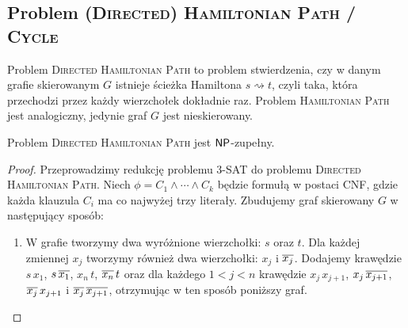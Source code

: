 \subsection{Problem \textsc{(Directed) Hamiltonian Path / Cycle}}

Problem \textsc{Directed Hamiltonian Path} to problem stwierdzenia, czy w danym grafie skierowanym $G$ istnieje ścieżka Hamiltona $s \rightsquigarrow t$, czyli taka, która przechodzi przez każdy wierzchołek dokładnie raz. Problem \textsc{Hamiltonian Path} jest analogiczny, jedynie graf $G$ jest nieskierowany.

\begin{theorem}
    Problem \textsc{Directed Hamiltonian Path} jest $\textsf{NP}$-zupełny.
\end{theorem}
\begin{proof}
    Przeprowadzimy redukcję problemu 3-SAT do problemu \textsc{Directed Hamiltonian Path}. Niech $\phi = C_1 \land \cdots \land C_k$ będzie formułą w postaci CNF, gdzie każda klauzula $C_i$ ma co najwyżej trzy literały. Zbudujemy graf skierowany $G$ w następujący sposób:
    \begin{enumerate}
        \item W grafie tworzymy dwa wyróżnione wierzchołki: $s$ oraz $t$. Dla każdej zmiennej $x_j$ tworzymy również dwa wierzchołki: $x_j$ i $\overline{x_j}$. Dodajemy krawędzie $s\,x_1$, $s\,\overline{x_1}$, $x_n\,t$, $\overline{x_n}\,t$ oraz dla każdego $1 < j < n$ krawędzie $x_j\,x_{j+1}$, $x_j\,\overline{x_{j+1}}$, $\overline{x_j}\,x_{j+1}$ i $\overline{x_j}\,\overline{x_{j+1}}$, otrzymując w ten sposób poniższy graf.
        \begin{figure}[H]
            \centering
        \end{figure}


\end{enumerate}
\end{proof}
